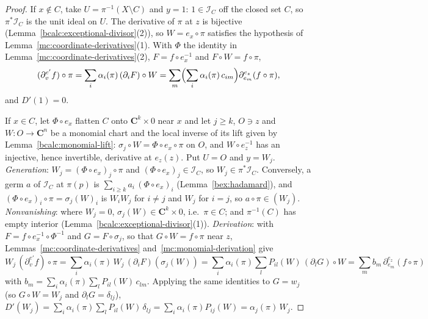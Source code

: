 \begin{proof}
\leanok
If \(x\notin C\), take \(U=\pi^{-1}(X\setminus C)\) and \(y=1\): \(1\in\mathcal I_C\) off the closed set \(C\), so \(\pi^*\mathcal I_C\) is the unit ideal on \(U\).
The derivative of \(\pi\) at \(z\) is bijective (Lemma~\ref{bcalc:exceptional-divisor}(2)), so \(W=e_x\circ\pi\) satisfies the hypothesis of
Lemma~\ref{mc:coordinate-derivatives}(1). With \(\Phi\) the identity in Lemma~\ref{mc:coordinate-derivatives}(2), \(F=f\circ e_x^{-1}\) and \(F\circ W=f\circ\pi\),
\[
 (\partial^{e'}_vf)\circ\pi=\sum_i\alpha_i(\pi)\,(\partial_iF)\circ W=\sum_m\Bigl(\sum_i\alpha_i(\pi)\,c_{im}\Bigr)\partial^{e_z}_{e_m}(f\circ\pi),
\]
and \(D'(1)=0\).

If \(x\in C\), let \(\Phi\circ e_x\) flatten \(C\) onto \(\mathbf C^k\times0\) near \(x\) and let \(j\ge k\), \(O\ni z\) and \(W\colon O\to\mathbf C^n\) be a monomial
chart and the local inverse of its lift given by Lemma~\ref{bcalc:monomial-lift}: \(\sigma_j\circ W=\Phi\circ e_x\circ\pi\) on \(O\), and
\(W\circ e_z^{-1}\) has an injective, hence invertible, derivative at \(e_z(z)\). Put \(U=O\) and \(y=W_j\).
\emph{Generation}: \(W_j=(\Phi\circ e_x)_j\circ\pi\) and \((\Phi\circ e_x)_j\in\mathcal I_C\), so \(W_j\in\pi^*\mathcal I_C\). Conversely, a germ \(a\) of \(\mathcal I_C\)
at \(\pi(p)\) is \(\sum_{i\ge k}a_i\,(\Phi\circ e_x)_i\) (Lemma~\ref{bex:hadamard}), and \((\Phi\circ e_x)_i\circ\pi=\sigma_j(W)_i\) is \(W_iW_j\) for \(i\ne j\) and \(W_j\) for
\(i=j\), so \(a\circ\pi\in(W_j)\). \emph{Nonvanishing}: where \(W_j=0\), \(\sigma_j(W)\in\mathbf C^k\times0\), i.e.\ \(\pi\in C\); and \(\pi^{-1}(C)\) has empty
interior (Lemma~\ref{bcalc:exceptional-divisor}(1)). \emph{Derivation}: with \(F=f\circ e_x^{-1}\circ\Phi^{-1}\) and \(G=F\circ\sigma_j\), so that
\(G\circ W=f\circ\pi\) near \(z\), Lemmas~\ref{mc:coordinate-derivatives} and~\ref{mc:monomial-derivation} give
\[
 W_j\,(\partial^{e'}_vf)\circ\pi=\sum_i\alpha_i(\pi)\,W_j\,(\partial_iF)(\sigma_j(W))=\sum_i\alpha_i(\pi)\sum_lP_{il}(W)\,(\partial_lG)\circ W=\sum_mb_m\,\partial^{e_z}_{e_m}(f\circ\pi)
\]
with \(b_m=\sum_i\alpha_i(\pi)\sum_lP_{il}(W)\,c_{lm}\). Applying the same identities to \(G=w_j\) (so \(G\circ W=W_j\) and \(\partial_lG=\delta_{lj}\)),
\(D'(W_j)=\sum_i\alpha_i(\pi)\sum_lP_{il}(W)\,\delta_{lj}=\sum_i\alpha_i(\pi)P_{ij}(W)=\alpha_j(\pi)\,W_j\).
\end{proof}

